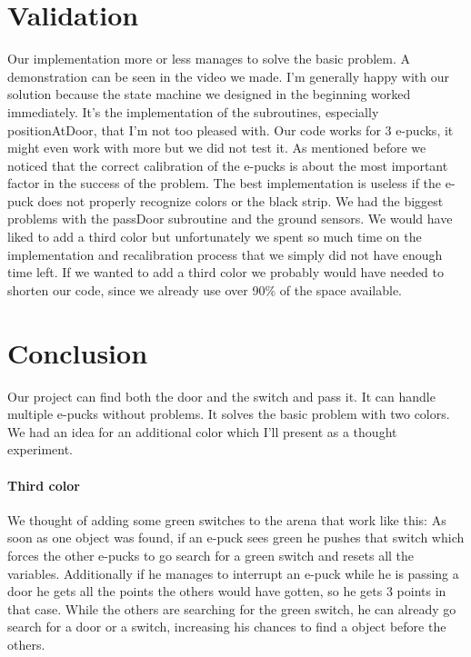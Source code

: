 \documentclass[12pt,a4paper]{article}
\begin{document}
\section{Validation}
Our implementation more or less manages to solve the basic  problem. A demonstration can be seen in the video we made. I'm generally happy with our solution because the state machine we designed in the beginning worked immediately. It's the implementation of the subroutines, especially positionAtDoor, that I'm not too pleased with. Our code works for 3 e-pucks, it might even work with more but we did not test it. As mentioned before we noticed that the correct calibration of the e-pucks is about the most important factor in the success of the problem. The best implementation is useless if the e-puck does not properly recognize colors or the black strip. We had the biggest problems with the passDoor subroutine and the ground sensors. We would have liked to add a third color but unfortunately we spent so much time on the implementation and recalibration process that we simply did not have enough time left. If we wanted to add a third color we probably would have needed to shorten our code, since we already use over 90\% of the space available. 

\section*{Conclusion}
Our project can find both the door and the switch and pass it. It can handle multiple e-pucks without problems. It solves the basic problem with two colors. We had an idea for an additional color which I'll present as a thought experiment.

\paragraph{Third color} We thought of adding some green switches to the arena that work like this: As soon as one object was found, if an e-puck sees green he pushes that switch which forces the other e-pucks to go search for a green switch and resets all the variables. Additionally if he manages to interrupt an e-puck while he is passing a door he gets all the points the others would have gotten, so he gets 3 points in that case. While the others are searching for the green switch, he can already go search for a door or a switch, increasing his chances to find a object before the others. 
\end{document}
